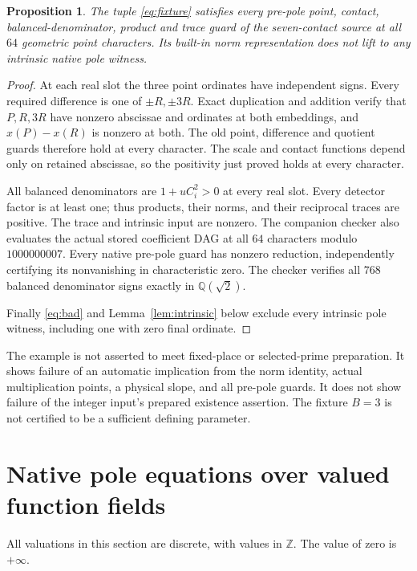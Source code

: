 \documentclass[11pt,a4paper]{article}
\newtheorem{proposition}[theorem]{Proposition}
\newcommand{\Q}{\mathbb Q}\newcommand{\Z}{\mathbb Z}
\begin{document}
\begin{proposition}\label{prop:example}
The tuple \eqref{eq:fixture} satisfies every pre-pole point, contact,
balanced-denominator, product and trace guard of the seven-contact
source at all $64$ geometric point characters. Its built-in norm
representation does not lift to any intrinsic native pole witness.
\end{proposition}
\begin{proof}
At each real slot the three point ordinates have independent signs.
Every required difference is one of $\pm R,\pm3R$. Exact duplication
and addition verify that $P,R,3R$ have nonzero abscissae and ordinates
at both embeddings, and $x(P)-x(R)$ is nonzero at both. The old point,
difference and quotient guards therefore hold at every character.
The scale and contact functions depend only on retained abscissae,
so the positivity just proved holds at every character.

All balanced denominators are $1+uC_i^2>0$ at every real slot.
Every detector factor is at least one; thus products, their norms,
and their reciprocal traces are positive. The trace and intrinsic
input are nonzero. The companion checker also evaluates the actual
stored coefficient DAG at all $64$ characters modulo $1000000007$.
Every native pre-pole guard has nonzero reduction, independently
certifying its nonvanishing in characteristic zero. The checker
verifies all $768$ balanced denominator signs exactly in $\Q(\sqrt2)$.

Finally \eqref{eq:bad} and Lemma~\ref{lem:intrinsic} below exclude
every intrinsic pole witness, including one with zero final ordinate.
\end{proof}

The example is not asserted to meet fixed-place or selected-prime
preparation. It shows failure of an automatic implication from the
norm identity, actual multiplication points, a physical slope, and
all pre-pole guards. It does not show failure of the integer input's
prepared existence assertion. The fixture $B=3$ is not certified to
be a sufficient defining parameter.

\section{Native pole equations over valued function fields}
All valuations in this section are discrete, with values in $\Z$.
The value of zero is $+\infty$.
\end{document}
